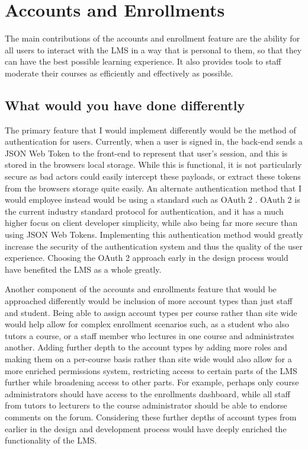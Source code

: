 \section{Accounts and Enrollments}

The main contributions of the accounts and enrollment feature are the ability for all users to interact with the LMS in a way that is personal to them, so that they can have the best possible learning experience. It also provides tools to staff moderate their courses as efficiently and effectively as possible.

\subsection{What would you have done differently}

The primary feature that I would implement differently would be the method of authentication for users. Currently, when a user is signed in, the back-end sends a JSON Web Token to the front-end to represent that user's session, and this is stored in the browsers local storage. While this is functional, it is not particularly secure as bad actors could easily intercept these payloads, or extract these tokens from the browsers storage quite easily. An alternate authentication method that I would employee instead would be using a standard such as OAuth 2 \cite{oauth2}. OAuth 2 is the current industry standard protocol for authentication, and it has a much higher focus on client developer simplicity, while also being far more secure than using JSON Web Tokens. Implementing this authentication method would greatly increase the security of the authentication system and thus the quality of the user experience. Choosing the OAuth 2 approach early in the design process would have benefited the LMS as a whole greatly.

Another component of the accounts and enrollments feature that would be approached differently would be inclusion of more account types than just staff and student. Being able to assign account types per course rather than site wide would help allow for complex enrollment scenarios such, as a student who also tutors a course, or a staff member who lectures in one course and administrates another. Adding further depth to the account types by adding more roles and making them on a per-course basis rather than site wide would also allow for a more enriched permissions system, restricting access to certain parts of the LMS further while broadening access to other parts. For example, perhaps only course administrators should have access to the enrollments dashboard, while all staff from tutors to lecturers to the course administrator should be able to endorse comments on the forum. Considering these further depths of account types from earlier in the design and development process would have deeply enriched the functionality of the LMS.

